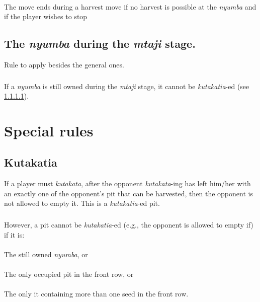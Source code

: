 \documentclass[12pt,a4paper]{article}
\begin{document}
\paragraph{}\label{NyuTndks3.2} 
The move ends during a harvest move if no harvest is possible at the {\it nyumba} and if the player wishes to stop

\subsection{\bf The {\it nyumba} during the {\it mtaji} stage.}\label{NyuTndtms}
Rule to apply besides the general ones.

\subsubsection{}\label{NyuTndtms1}
If a {\it nyumba} is still owned during the {\it mtaji} stage, it cannot be {\it kutakatia}-ed (see \ref{Kut1.1}).

\section{Special rules}\label{Sr}

\subsection{\bf Kutakatia}\label{Kut} 
If a player must {\it kutakata}, after the opponent {\it kutakata}-ing has left him/her with an exactly one of the opponent's pit that can be harvested, then the opponent is not allowed to empty it. This is a {\it kutakatia}-ed pit.

\subsubsection{}\label{Kut1}
However, a pit cannot be {\it kutakatia}-ed (e.g., the opponent is allowed to empty if) if it is:
\paragraph{}\label{Kut1.1} 
The still owned {\it nyumba}, or
\paragraph{}\label{Kut1.2}
The only occupied pit in the front row, or
\paragraph{}\label{Kut1.3}
The only it containing more than one seed in the front row.
\end{document}
